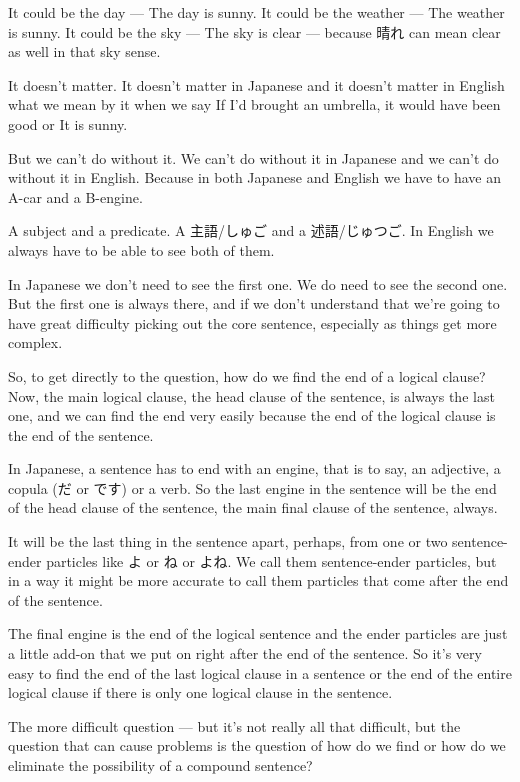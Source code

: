It could be the day --- The day is sunny. It could be the weather --- The weather is sunny. It could be the sky --- The sky is clear --- because 晴れ can mean clear as well in that sky sense.

It doesn't matter. It doesn't matter in Japanese and it doesn't matter in English what we mean by it when we say If I'd brought an umbrella, it would have been good or It is sunny.

But we can't do without it. We can't do without it in Japanese and we can't do without it in English. Because in both Japanese and English we have to have an A-car and a B-engine.

A subject and a predicate. A 主語/しゅご and a 述語/じゅつご. In English we always have to be able to see both of them.

In Japanese we don't need to see the first one. We do need to see the second one. But the first one is always there, and if we don't understand that we're going to have great difficulty picking out the core sentence, especially as things get more complex.

{}

So, to get directly to the question, how do we find the end of a logical clause? Now, the main logical clause, the head clause of the sentence, is always the last one, and we can find the end very easily because the end of the logical clause is the end of the sentence.

In Japanese, a sentence has to end with an engine, that is to say, an adjective, a copula (だ or です) or a verb. So the last engine in the sentence will be the end of the head clause of the sentence, the main final clause of the sentence, always.

{}

It will be the last thing in the sentence apart, perhaps, from one or two sentence-ender particles like よ or ね or よね. We call them sentence-ender particles, but in a way it might be more accurate to call them particles that come after the end of the sentence.

The final engine is the end of the logical sentence and the ender particles are just a little add-on that we put on right after the end of the sentence. So it's very easy to find the end of the last logical clause in a sentence or the end of the entire logical clause if there is only one logical clause in the sentence.

The more difficult question --- but it's not really all that difficult, but the question that can cause problems is the question of how do we find or how do we eliminate the possibility of a compound sentence?

